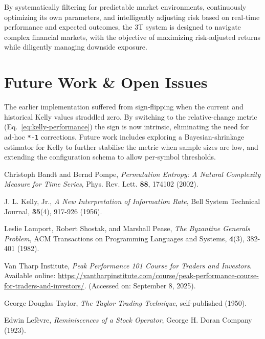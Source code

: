 \documentclass[10pt]{article}
\begin{document}
By systematically filtering for predictable market environments, continuously optimizing its own parameters, and intelligently adjusting risk based on real‑time performance and expected outcomes, the 3T system is designed to navigate complex financial markets, with the objective of maximizing risk‑adjusted returns while diligently managing downside exposure.

\section{Future Work \& Open Issues}
The earlier implementation suffered from sign‑flipping when the current and historical Kelly values straddled zero. By switching to the relative‑change metric (Eq.~\ref{eq:kelly-performance}) the sign is now intrinsic, eliminating the need for ad‑hoc \texttt{*‑1} corrections. Future work includes exploring a Bayesian‑shrinkage estimator for Kelly to further stabilise the metric when sample sizes are low, and extending the configuration schema to allow per‑symbol thresholds.

\begin{thebibliography}{9}

Christoph Bandt and Bernd Pompe,
\textit{Permutation Entropy: A Natural Complexity Measure for Time Series},
Phys. Rev. Lett. \textbf{88}, 174102 (2002).

J. L. Kelly, Jr.,
\textit{A New Interpretation of Information Rate},
Bell System Technical Journal, \textbf{35}(4), 917-926 (1956).

Leslie Lamport, Robert Shostak, and Marshall Pease,
\textit{The Byzantine Generals Problem},
ACM Transactions on Programming Languages and Systems, \textbf{4}(3), 382-401 (1982).

Van Tharp Institute,
\textit{Peak Performance 101 Course for Traders and Investors}.
Available online: \url{https://vantharpinstitute.com/course/peak-performance-course-for-traders-and-investors/}.
(Accessed on: September 8, 2025).

George Douglas Taylor,
\textit{The Taylor Trading Technique},
self-published (1950).

Edwin Lefèvre,
\textit{Reminiscences of a Stock Operator},
George H. Doran Company (1923).

\end{thebibliography}
\end{document}
